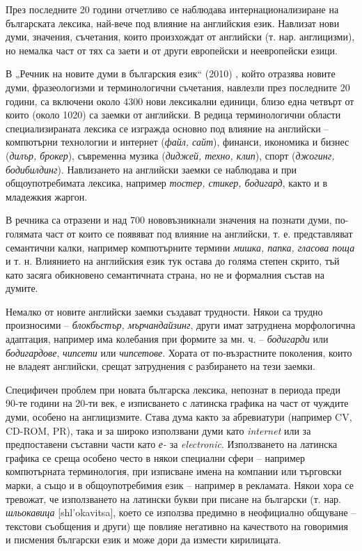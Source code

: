 \documentclass[]{../../metanetpaper}
\begin{document}
\begin{multicols}{2}
През последните 20 години отчетливо се наблюдава интернационализиране на българската лексика, най-вече под влияние на английския език. Навлизат нови думи, значения, съчетания, които произхождат от английски (т. нар. англицизми), но немалка част от тях са заети и от други европейски и неевропейски езици.


В „Речник на новите думи в българския език“ (2010) \cite{NWDict}, който отразява новите думи, фразеологизми и
 терминологични съчетания, навлезли през последните 20 години,
 са включени около 4300 нови лексикални единици,
 близо една четвърт от които (около 1020) са заемки от
 английски. В редица терминологични области
 специализираната лексика се изгражда основно под
 влияние на английски – компютърни технологии и
 интернет ({\it файл, сайт}), финанси, икономика и бизнес
 ({\it дилър, брокер}), съвременна музика ({\it диджей, техно, клип}),
 спорт ({\it джогинг, бодибилдинг}). Навлизането на английски
 заемки се наблюдава и при общоупотребимата лексика, например {\it тостер, стикер, бодигард}, както и в младежкия
 жаргон.

В речника са отразени и над 700 нововъзникнали значения на познати думи, по-голямата част от които се появяват под влияние на английски, т. е. представляват
 семантични калки, например компютърните термини
\textit{мишка, папка, гласова поща} и т. н. Влиянието на
 английския език тук остава до голяма степен скрито, тъй
 като засяга обикновено семантичната страна, но не и
 формалния състав на думите. 

Немалко от новите
 английски заемки създават трудности. Някои са трудно
 произносими – {\it блокбъстър, мърчандайзинг}, други имат
 затруднена морфологична адаптация, например има
 колебания при формите за мн. ч. – {\it бодигарди} или
{\it бодигардове}, {\it чипсети} или {\it чипсетове}. Хората от по-възрастните поколения, които
 не владеят английски, срещат затруднения с разбирането на тези заемки.

Специфичен проблем при новата българска лексика, непознат в периода преди 90-те години на 20-ти век, е изписването с латинска графика на част от чуждите думи, особено на англицизмите. Става дума както за абревиатури (например CV, CD-ROM, PR), така и за широко използвани думи като \textit{internet} или за предпоставени съставни части като \textit{е-} за {\it electronic}. Използването на латинска графика се среща
 особено често в някои специални сфери – например компютърната терминология, при изписване имена на компании или търговски марки, а също и в общоупотребимия език – например в рекламата.
 Някои хора се тревожат, че използването на латински букви при писане на български (т. нар. \textit{шльокавица} [shl'okavitsa], което се използва предимно в неофициално общуване – текстови съобщения и други) \cite{shlyokavica} ще повлияе негативно на качеството на говоримия и писмения български език и може дори да измести кирилицата.


\end{multicols}
\end{document}
